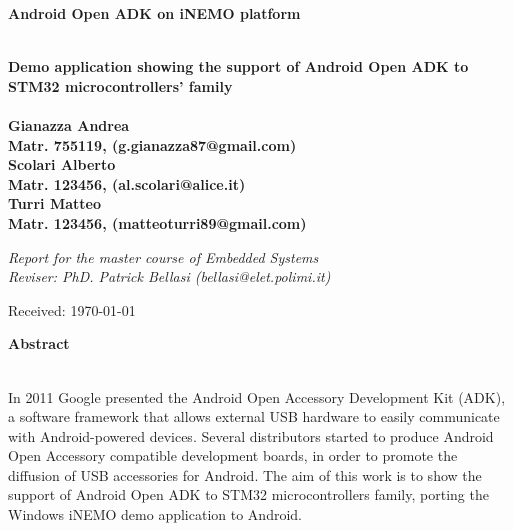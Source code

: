 \documentclass[a4paper,10pt]{article}
\newenvironment*{mytitle}{\begin{LARGE}\bf}{\end{LARGE}\\}%
\newenvironment*{mysubtitle}{\bf}{\\[1.5ex]}%
\newenvironment*{myabstract}{\begin{Large}\bf}{\end{Large}\\[2.5ex]}%
\begin{document}
\begin{mytitle}Android Open ADK on iNEMO platform\end{mytitle}
\begin{mysubtitle}Demo application showing the support of Android Open ADK to STM32 microcontrollers' family\end{mysubtitle}
%
%
\\
Gianazza Andrea\\
Matr. 755119, (g.gianazza87@gmail.com)\\
\hspace{10ex}
Scolari Alberto\\
Matr. 123456, (al.scolari@alice.it)\\
\hspace{10ex}
Turri Matteo\\
Matr. 123456, (matteoturri89@gmail.com)\\
\begin{flushright}
\emph{Report for the master course of Embedded Systems}\\
\emph{Reviser: PhD. Patrick Bellasi (bellasi@elet.polimi.it)}
\end{flushright}

Received: \today \\
\hspace{10ex}

\begin{myabstract} Abstract \end{myabstract}
In 2011 Google presented the Android Open Accessory Development Kit (ADK), a software framework that allows external USB hardware to easily communicate with Android-powered devices. Several distributors started to produce Android Open Accessory compatible development boards, in order to promote the diffusion of USB accessories for Android. The aim of this work is to show the support of Android Open ADK to STM32 microcontrollers family, porting the Windows iNEMO demo application to Android.

\vspace{4ex}	%
\begin{multicols}{2}










%
\nocite{*}



\end{multicols}
\end{document}

